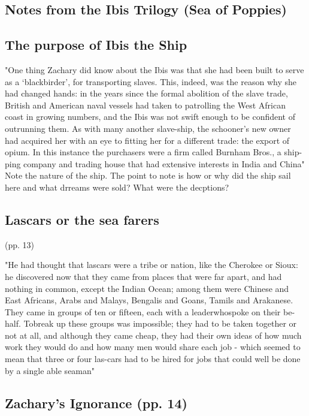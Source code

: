 \subsection{Notes from the Ibis Trilogy (Sea of Poppies)}


\subsection{The purpose of Ibis the Ship}

"One thing Zachary did know about the Ibis was that she had been built to serve as a ‘blackbirder’, for transporting slaves. This, indeed, was the reason why she had changed hands: in the years since the formal abolition of the slave trade, British and American naval vessels had taken to patrolling the West African coast in growing numbers, and the Ibis was not swift enough to be confident of outrunning them. As with many another slave-ship, the schooner’s new owner had acquired her with an eye to fitting her for a different trade: the export of opium. In this instance the purchasers were a firm called Burnham Bros., a ship-ping company and trading house that had extensive interests in India and China"
Note the nature of the ship. The point to note is how or why did the ship sail here and what drreams were sold? What were the decptions?

\subsection{Lascars or the sea farers }


(pp. 13)

"He had thought that lascars were a tribe or nation, like the Cherokee or Sioux: he discovered now that they came from places that were far apart, and had nothing in common, except the Indian Ocean; among them were Chinese and East Africans, Arabs and Malays, Bengalis and Goans, Tamils and Arakanese. They came in groups of ten or fifteen, each with a leaderwhospoke on their be-half. Tobreak up these groups was impossible; they had to be taken together or not at all, and although they came cheap, they had their own ideas of how much work they would do and how many men would share each job - which seemed to mean that three or four las-cars had to be hired for jobs that could well be done by a single able seaman"

\subsection{Zachary's Ignorance (pp. 14)}


